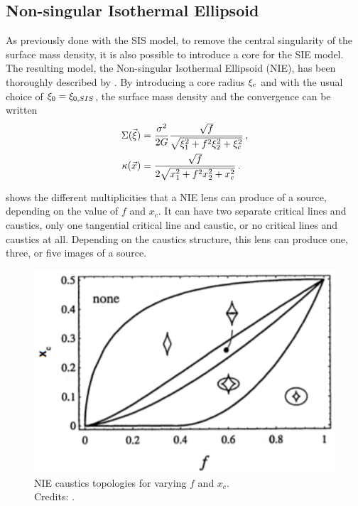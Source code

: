 \subsection{Non-singular Isothermal Ellipsoid}
\label{subsec:nie}
As previously done with the SIS model, to remove the central singularity of the surface mass density, it is also possible to introduce a core for the SIE model. The resulting model, the Non-singular Isothermal Ellipsoid (NIE), has been thoroughly described by \cite{kormann_isothermal_1994,tessore_elliptical_2015}. By introducing a core radius $\xi_c$ and with the usual choice of $\xi_0 = \xi_{0,SIS}$, the surface mass density and the convergence can be written
\begin{subequations}
\begin{align}
    \label{eq:3.42a}
    \Sigma (\va{\xi}) & = \frac{\sigma^2}{2 G} \frac{\sqrt{f}}{\sqrt{\xi_1^2 + f^2 \xi_2^2 + \xi_c^2}} \,,
    \\
    \label{eq:3.42b}
    \kappa (\vec{x}) & = \frac{\sqrt{f}}{2 \sqrt{x_1^2 + f^2 x_2^2 + x_c^2}} \,.
\end{align}
\end{subequations}

 shows the different multiplicities that a NIE lens can produce of a source, depending on the value of $f$ and $x_c$. It can have two separate critical lines and caustics, only one tangential critical line and caustic, or no critical lines and caustics at all. Depending on the caustics structure, this lens can produce one, three, or five images of a source.

\begin{figure}[b!]
    \centering
    \includegraphics[width=0.9\linewidth]{img//chapter3/nie.png}
    \caption[NIE caustics topologies]{NIE caustics topologies for varying $f$ and $x_c$.\\\small{Credits: \cite{kormann_isothermal_1994}.}}
    \label{fig:nie}
\end{figure}


